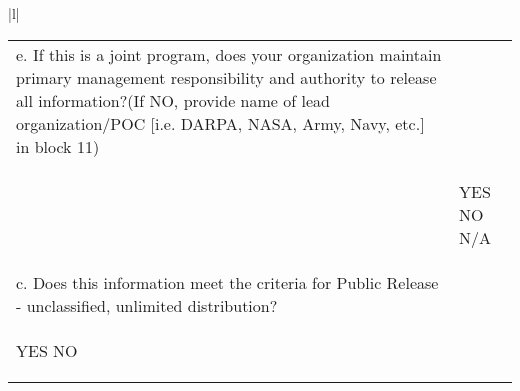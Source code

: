 \documentclass{article}
\begin{document}
{\begin{tabular}{|l|}
{\begin{tabularx}{\textwidth}{XX}
\scriptsize *e. If this is a joint program, does your organization maintain primary management responsibility and authority to release all information?\newline (If NO, provide name of lead organization/POC [i.e. DARPA, NASA, Army, Navy, etc.] in block 11)\\[-17pt]

&
\begin{center}
\radioButton{10e}{10bp}{10bp}{yes}\hspace{2pt} YES \hspace{40pt}
\radioButton{10e}{10bp}{10bp}{no} \hspace{2pt} NO \hspace{40pt}
\radioButton{10e}{10bp}{10bp}{na} \hspace{2pt} N/A
\end{center}\\[-25pt]

\scriptsize *c. Does this information meet the criteria for Public Release - unclassified, unlimited distribution?\\[-17pt]

\begin{center}
\radioButton{10c}{10bp}{10bp}{yes}\hspace{2pt} YES \hspace{40pt}
\radioButton{10c}{10bp}{10bp}{no} \hspace{2pt} NO 
\end{center} & \\[-5pt]
\end{tabularx}
}


\end{tabular}}
\end{document}
